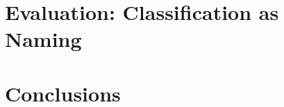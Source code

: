 \documentclass[11pt,a4paper]{article}
\begin{document}
	
	\section{Evaluation: Classification as Naming}
	\label{sec:modeling}
	
	
	\section{Conclusions}
	\label{sec:conc}
	
	
	
	
	
\end{document}
